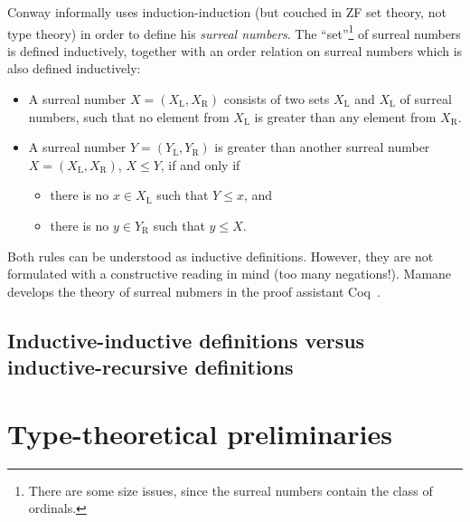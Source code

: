 \documentclass{article}
\begin{document}
\begin{example}
\label{ex:surreal}

Conway \cite{conway2001ONAG} informally uses induction-induction (but
couched in ZF set theory, not type theory) in order to define his
\emph{surreal numbers}. The ``set''\footnote{There are some size
  issues, since the surreal numbers contain the class of ordinals.} of
surreal numbers is defined inductively, together with an order
relation on surreal numbers which is also defined inductively:

\begin{itemize}
\item A surreal number $X = (X_\mathrm{L}, X_\mathrm{R})$ consists of
  two sets $X_\mathrm{L}$ and $X_\mathrm{L}$ of surreal numbers, such
  that no element from $X_\mathrm{L}$ is greater than any element from
  $X_\mathrm{R}$.
\item A surreal number $Y = (Y_\mathrm{L}, Y_\mathrm{R})$ is greater
  than another surreal number $X = (X_\mathrm{L}, X_\mathrm{R})$, $X \leq Y$, if and
  only if
  \begin{itemize}
  \item there is no $x \in X_\mathrm{L}$ such that $Y \leq x$, and
  \item there is no $y \in Y_\mathrm{R}$ such that $y \leq X$.
  \end{itemize}
\end{itemize}

Both rules can be understood as inductive definitions. However, they
are not formulated with a constructive reading in mind (too many
negations!). Mamane~\cite{mamane2004surrealCoq} develops the theory of
surreal nubmers in the proof assistant Coq~\cite{coq}. %
\blackqed
\end{example}


\subsection{Inductive-inductive definitions versus inductive-recursive definitions}
\label{sec:indind-vs-IR}

\section{Type-theoretical preliminaries}
\label{sec:preliminaries}
\end{document}
